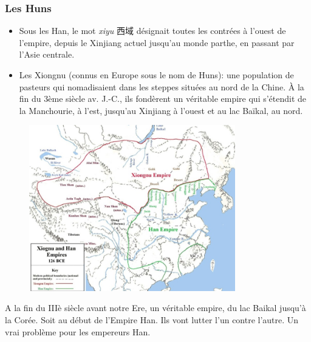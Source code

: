 \subsubsection{Les Huns}
\begin{itemize}
    \item  	Sous les Han, le mot \textit{xiyu} 西域  désignait toutes les contrées à l’ouest de l’empire, depuis le Xinjiang actuel jusqu’au monde parthe, en passant par l’Asie centrale.

   \item Les Xiongnu (connus en Europe sous le nom de Huns): une population de pasteurs qui nomadisaient dans les steppes situées au nord de la Chine. À la fin du 3ème siècle av. J.-C., ils fondèrent un véritable empire qui s’étendit de la Manchourie, à l’est, jusqu’au Xinjiang à l’ouest et au lac Baïkal, au nord.
   \end{itemize}
\begin{figure}[!h]
    \centering
    \includegraphics[width=0.8\textwidth]{ConfucianismeTaoismeBouddhismeChinois/Images/xiognu Han.jpg}

    \label{fig:enter-label}
\end{figure}


A la fin du IIIè siècle avant notre Ere, un véritable empire, du lac Baikal jusqu'à la Corée. Soit au début de l'Empire Han. Ils vont lutter l'un contre l'autre. Un vrai problème pour les empereurs Han.


